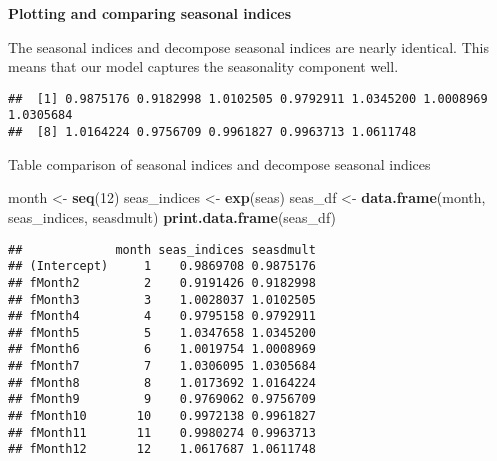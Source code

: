 \documentclass[
]{article}
\newenvironment{Shaded}{\begin{snugshade}}{\end{snugshade}}
\newcommand{\AttributeTok}[1]{\textcolor[rgb]{0.13,0.29,0.53}{#1}}
\newcommand{\DecValTok}[1]{\textcolor[rgb]{0.00,0.00,0.81}{#1}}
\newcommand{\FunctionTok}[1]{\textcolor[rgb]{0.13,0.29,0.53}{\textbf{#1}}}
\newcommand{\NormalTok}[1]{#1}
\newcommand{\OtherTok}[1]{\textcolor[rgb]{0.56,0.35,0.01}{#1}}
\newcommand{\SpecialCharTok}[1]{\textcolor[rgb]{0.81,0.36,0.00}{\textbf{#1}}}
\newcommand{\StringTok}[1]{\textcolor[rgb]{0.31,0.60,0.02}{#1}}
\begin{document}
\textbf{Plotting and comparing seasonal indices}

The seasonal indices and decompose seasonal indices are nearly
identical. This means that our model captures the seasonality component
well.

\begin{Shaded}
\end{Shaded}

\begin{verbatim}
##  [1] 0.9875176 0.9182998 1.0102505 0.9792911 1.0345200 1.0008969 1.0305684
##  [8] 1.0164224 0.9756709 0.9961827 0.9963713 1.0611748
\end{verbatim}

Table comparison of seasonal indices and decompose seasonal indices

\begin{Shaded}
\begin{Highlighting}[]
\NormalTok{month }\OtherTok{\textless{}{-}} \FunctionTok{seq}\NormalTok{(}\DecValTok{12}\NormalTok{)}
\NormalTok{seas\_indices }\OtherTok{\textless{}{-}} \FunctionTok{exp}\NormalTok{(seas)}
\NormalTok{seas\_df }\OtherTok{\textless{}{-}} \FunctionTok{data.frame}\NormalTok{(month, seas\_indices, seasdmult)}
\FunctionTok{print.data.frame}\NormalTok{(seas\_df)}
\end{Highlighting}
\end{Shaded}

\begin{verbatim}
##             month seas_indices seasdmult
## (Intercept)     1    0.9869708 0.9875176
## fMonth2         2    0.9191426 0.9182998
## fMonth3         3    1.0028037 1.0102505
## fMonth4         4    0.9795158 0.9792911
## fMonth5         5    1.0347658 1.0345200
## fMonth6         6    1.0019754 1.0008969
## fMonth7         7    1.0306095 1.0305684
## fMonth8         8    1.0173692 1.0164224
## fMonth9         9    0.9769062 0.9756709
## fMonth10       10    0.9972138 0.9961827
## fMonth11       11    0.9980274 0.9963713
## fMonth12       12    1.0617687 1.0611748
\end{verbatim}
\end{document}
